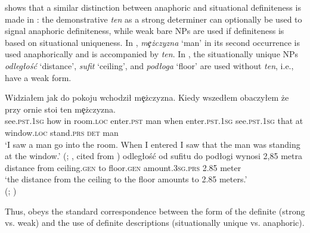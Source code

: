 \documentclass[output=paper]{langscibook}
\begin{document}
\noindent \citet{Czardybon2017} shows that a similar distinction between anaphoric and situational definiteness is made in : the demonstrative \textit{ten} as a strong determiner can optionally be used to signal anaphoric definiteness, while weak bare NPs are used if definiteness is based on situational uniqueness. In , \textit{mȩżczyzna} `man' in its second occurrence is used anaphorically and is accompanied by \textit{ten}. In , the situationally unique NPs \textit{odległość} `distance', \textit{sufit} `ceiling’, and \textit{podłoga} `floor' are used without \textit{ten}, i.e., have a weak form.\largerpage


\ea \label{ex:8}
\ea
\gll Widziałem jak do pokoju wchodził mȩżczyzna. Kiedy wszedłem obaczyłem że przy ornie stoi ten mȩżczyzna. \\
    see.\textsc{pst}.1\textsc{sg} how in room.\textsc{loc} enter.\textsc{pst} man when enter.\textsc{pst}.1\textsc{sg} see.\textsc{pst}.1\textsc{sg} that at window.\textsc{loc} stand.\textsc{prs} \textsc{det} man\\
\glt `I saw a man go into the room. When I entered I saw that the man was standing at the window.' \glt \hfill (; \citealt[96--97]{Szwedek1976}, cited from \citealt[50]{Czardybon2017})\label{ex:8a}
\ex \gll [\dots] odległość od sufitu do podłogi wynosi 2,85 metra \\
 {} distance from ceiling.\textsc{gen} to floor.\textsc{gen} amount.3\textsc{sg.prs} 2.85 meter\\
\glt `the distance from the ceiling to the floor amounts to 2.85 meters.' \\
\glt \hfill (; \citealt[74]{Czardybon2017}) \label{ex:8b}
\z
\z

\noindent Thus,  obeys the standard correspondence between the form of the definite (strong vs. weak) and the use of definite descriptions (situationally unique vs. anaphoric).
\end{document}
